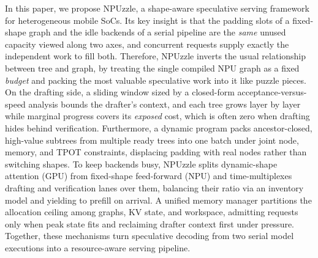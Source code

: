 \documentclass[sigconf,nonacm,10pt]{acmart}
\newcommand{\name}{NPUzzle\xspace}
\begin{document}
In this paper, we propose \name, a shape-aware speculative serving framework for heterogeneous mobile SoCs. Its key insight is that the padding slots of a fixed-shape graph and the idle backends of a serial pipeline are the \emph{same} unused capacity viewed along two axes, and concurrent requests supply exactly the independent work to fill both. Therefore, \name inverts the usual relationship between tree and graph, by treating the single compiled NPU graph as a fixed \emph{budget} and packing the most valuable speculative work into it like puzzle pieces. On the drafting side, a sliding window sized by a closed-form acceptance-versus-speed analysis bounds the drafter's context, and each tree grows layer by layer while marginal progress covers its \emph{exposed} cost, which is often zero when drafting hides behind verification. Furthermore,  a dynamic program packs ancestor-closed, high-value subtrees from multiple ready trees into one batch under joint node, memory, and TPOT constraints, displacing padding with real nodes rather than switching shapes. To keep backends busy, \name splits dynamic-shape attention (GPU) from fixed-shape feed-forward (NPU) and time-multiplexes drafting and verification lanes over them, balancing their ratio via an inventory model and yielding to prefill on arrival. A unified memory manager partitions the allocation ceiling among graphs, KV state, and workspace, admitting requests only when peak state fits and reclaiming drafter context first under pressure. Together, these mechanisms turn speculative decoding from two serial model executions into a resource-aware serving pipeline.
\end{document}

